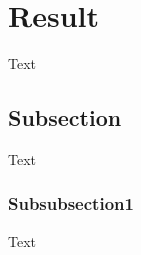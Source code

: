 \section{Result}\label{sec:result}
Text

\subsection{Subsection}
Text
\subsubsection{Subsubsection1}
Text
